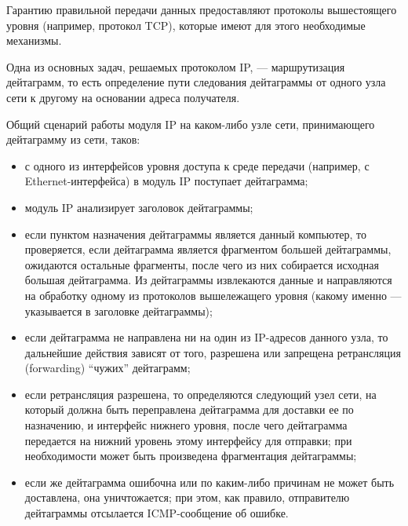 Гарантию правильной передачи данных предоставляют протоколы вышестоящего уровня (например, протокол TCP), которые имеют для этого необходимые механизмы.

Одна из основных задач, решаемых протоколом IP, --- маршрутизация дейтаграмм,
то есть определение пути следования дейтаграммы от одного узла сети
к другому на основании адреса получателя.

Общий сценарий работы модуля IP на каком-либо узле сети,
принимающего дейтаграмму из сети, таков:
\begin{itemize}
  \item с одного из интерфейсов уровня доступа к среде передачи (например,
    с Ethernet-интерфейса) в модуль IP поступает дейтаграмма;
  \item модуль IP анализирует заголовок дейтаграммы;
  \item если пунктом назначения дейтаграммы является данный компьютер, то проверяется,
    если дейтаграмма является фрагментом большей дейтаграммы,
    ожидаются остальные фрагменты, после чего из них собирается
    исходная большая дейтаграмма. Из дейтаграммы извлекаются данные
    и направляются на обработку одному из протоколов вышележащего
    уровня (какому именно --- указывается в заголовке дейтаграммы);
  \item если дейтаграмма не направлена ни на один из IP-адресов данного узла,
    то дальнейшие действия зависят от того, разрешена или запрещена
    ретрансляция (forwarding) “чужих” дейтаграмм;
  \item если ретрансляция разрешена, то определяются следующий узел сети,
    на который должна быть переправлена дейтаграмма для доставки ее по назначению,
    и интерфейс нижнего уровня, после чего дейтаграмма передается
    на нижний уровень этому интерфейсу для отправки;
    при необходимости может быть произведена фрагментация дейтаграммы;
  \item если же дейтаграмма ошибочна или по каким-либо причинам не может быть
    доставлена, она уничтожается; при этом, как правило, отправителю
    дейтаграммы отсылается ICMP-сообщение об ошибке.
\end{itemize}

